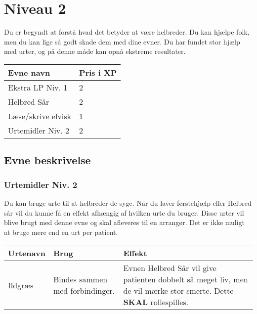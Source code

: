 \chapter{Niveau 2}
Du er begyndt at forstå hvad det betyder at være helbreder. Du kan hjælpe folk, men du kan lige så godt skade dem med dine evner. Du har fundet stor hjælp med urter, og på denne måde kan opnå ekstreme resultater.
\begin{table}[H]
    \centering
    \begin{tabular}{|p{}|p{}|}
    \rowcolor{cerulean!80}\hline
    Evne navn & Pris i XP \\\hline
    Ekstra LP Niv. 1 & 2\\\hline
    Helbred Sår & 2\\\hline
    Læse/skrive elvisk & 1\\\hline
    Urtemidler Niv. 2 & 2 \\\hline
    \end{tabular}
\end{table}
\section{Evne beskrivelse}







\subsection{Urtemidler Niv. 2}
Du kan bruge urte til at helbreder de syge. Når du laver førstehjælp eller Helbred sår vil du kunne få en effekt afhængig af hvilken urte du bruger. Disse urter vil blive brugt med denne evne og skal afleveres til en arrangør. Det er ikke muligt at bruge mere end en urt per patient.
\begin{table}[H]
     \centering
    \begin{tabular}{|p{}|p{}|p{}|}
    \rowcolor{cerulean!80}\hline
        Urtenavn & Brug & Effekt \\\hline
    Ildgræs & Bindes sammen med forbindinger. & Evnen Helbred Sår vil give patienten dobbelt så meget liv, men de vil mærke stor smerte. Dette \textbf{SKAL} rollespilles.\\\hline
    \end{tabular}
\end{table}